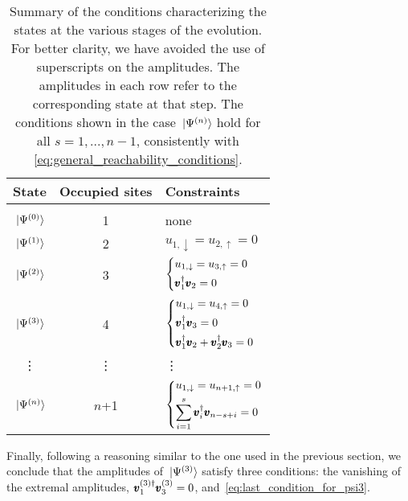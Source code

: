 \begin{table}
\begin{tabular}{cc@{\quad}l}
	\toprule
	\textbf{State} & \textbf{Occupied sites} & \textbf{Constraints} \\
	\midrule \\
	$\ket*{\Psi^{(0)}}$ & 1 & none \\
	\addlinespace[2pt]
	$\ket*{\Psi^{(1)}}$ & 2 & $u_{1,\downarrow} = u_{2,\uparrow} = 0$ \\
	\addlinespace[5pt]
	$\ket*{\Psi^{(2)}}$ & 3 &
	$\begin{dcases}
		u_{1,\downarrow} = u_{3,\uparrow} = 0 \\
		\pmb{v}_1^{\dagger} \pmb{v}_2 = 0
	\end{dcases}$ \\
	\addlinespace[5pt]
	$\ket*{\Psi^{(3)}}$ & 4 &
	$\begin{dcases}
		u_{1,\downarrow} = u_{4,\uparrow} = 0 \\
		\pmb{v}_1^{\dagger} \pmb{v}_3 = 0 \\
		\pmb{v}_1^{\dagger} \pmb{v}_2 + \pmb{v}_2^{\dagger} \pmb{v}_3 = 0
	\end{dcases}$ \\\addlinespace[4pt]
	\vdots & \vdots & \qquad\quad\vdots \\
	$\ket*{\Psi^{(n)}}$ & $n$+1 &
	$\begin{dcases}
		u_{1,\downarrow} = u_{n + 1,\uparrow} = 0 \\
		\sum_{i=1}^s \pmb{v}_i^{\dagger} \pmb{v}_{n-s+i} = 0
	\end{dcases}$ \\
	\bottomrule
\end{tabular}
\caption{
	Summary of the conditions characterizing the states at the various stages of the evolution.
	For better clarity, we have avoided the use of superscripts on the amplitudes.
The amplitudes in each row refer to the corresponding state at that step.
	The conditions shown in the case $\ket*{\Psi^{(n)}}$ hold for all $s=1,..., n-1$, consistently with \cref{eq:general_reachability_conditions}.
}
\label{table:constraints}
\end{table}
Finally, following a reasoning similar to the one used in the previous section, we conclude that the amplitudes of $\ket*{\Psi^{(3)}}$ satisfy three conditions:
the vanishing of the extremal amplitudes, $\pmb{v}_1^{(3)\dagger} \pmb{v}_3^{(3)} = 0$, and~\cref{eq:last_condition_for_psi3}.

